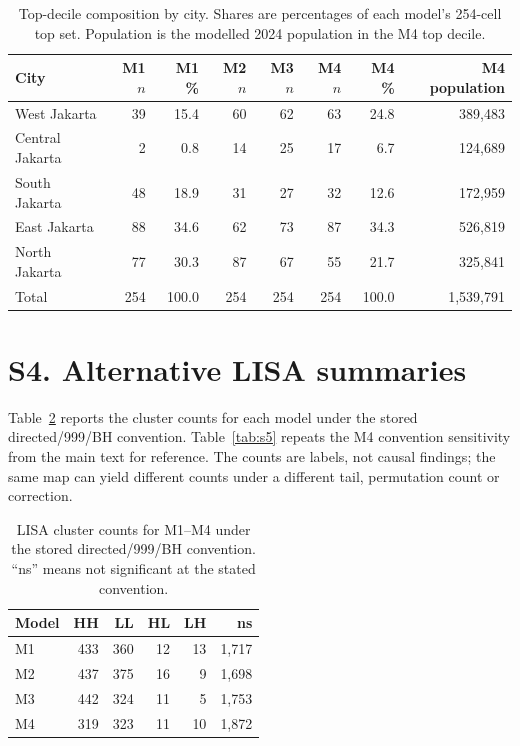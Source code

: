 \documentclass[times,twoside]{_Templates/MultiTargetManuscript}
\begin{document}
\begin{table}[H]
\centering
\small
\caption{Top-decile composition by city. Shares are percentages of each model's
254-cell top set. Population is the modelled 2024 population in the M4 top
decile.}
\label{tab:s3}
\begin{tabular}{@{}lrrrrrrr@{}}
\toprule
City & M1 $n$ & M1 \% & M2 $n$ & M3 $n$ & M4 $n$ & M4 \% & M4 population \\
\midrule
West Jakarta & 39 & 15.4 & 60 & 62 & 63 & 24.8 & 389,483 \\
Central Jakarta & 2 & 0.8 & 14 & 25 & 17 & 6.7 & 124,689 \\
South Jakarta & 48 & 18.9 & 31 & 27 & 32 & 12.6 & 172,959 \\
East Jakarta & 88 & 34.6 & 62 & 73 & 87 & 34.3 & 526,819 \\
North Jakarta & 77 & 30.3 & 87 & 67 & 55 & 21.7 & 325,841 \\
\midrule
Total & 254 & 100.0 & 254 & 254 & 254 & 100.0 & 1,539,791 \\
\bottomrule
\end{tabular}
\end{table}

\section*{S4. Alternative LISA summaries}

Table~\ref{tab:s4} reports the cluster counts for each model under the stored
directed/999/BH convention. Table~\ref{tab:s5} repeats the M4 convention
sensitivity from the main text for reference. The counts are labels, not causal
findings; the same map can yield different counts under a different tail,
permutation count or correction.

\begin{table}[H]
\centering
\small
\caption{LISA cluster counts for M1--M4 under the stored directed/999/BH
convention. ``ns'' means not significant at the stated convention.}
\label{tab:s4}
\begin{tabular}{@{}lrrrrr@{}}
\toprule
Model & HH & LL & HL & LH & ns \\
\midrule
M1 & 433 & 360 & 12 & 13 & 1,717 \\
M2 & 437 & 375 & 16 & 9 & 1,698 \\
M3 & 442 & 324 & 11 & 5 & 1,753 \\
M4 & 319 & 323 & 11 & 10 & 1,872 \\
\bottomrule
\end{tabular}
\end{table}
\end{document}
